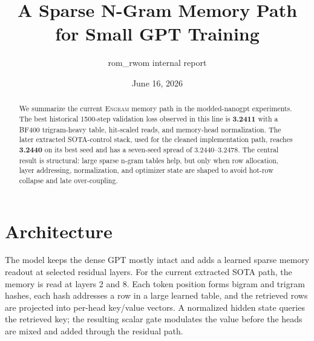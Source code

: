 \documentclass[10pt,twocolumn]{article}
\title{\vspace{-0.55in}\textbf{A Sparse N-Gram Memory Path for Small GPT Training}}
\author{rom\_rwom internal report}
\date{June 16, 2026}
\newcommand{\engram}{\textsc{Engram}}
\begin{document}
\maketitle
\vspace{-0.18in}

\begin{abstract}
We summarize the current \engram{} memory path in the modded-nanogpt
experiments.  The best historical 1500-step validation loss observed in this
line is \textbf{3.2411} with a BF400 trigram-heavy table, hit-scaled reads, and
memory-head normalization.  The later extracted SOTA-control stack, used for
the cleaned implementation path, reaches \textbf{3.2440} on its best seed and
has a seven-seed spread of 3.2440--3.2478.  The central result is structural:
large sparse n-gram tables help, but only when row allocation, layer addressing,
normalization, and optimizer state are shaped to avoid hot-row collapse and
late over-coupling.
\end{abstract}

\section{Architecture}
The model keeps the dense GPT mostly intact and adds a learned sparse memory
readout at selected residual layers.  For the current extracted SOTA path, the
memory is read at layers 2 and 8.  Each token position forms bigram and trigram
hashes, each hash addresses a row in a large learned table, and the retrieved
rows are projected into per-head key/value vectors.  A normalized hidden state
queries the retrieved key; the resulting scalar gate modulates the value before
the heads are mixed and added through the residual path.
\end{document}
